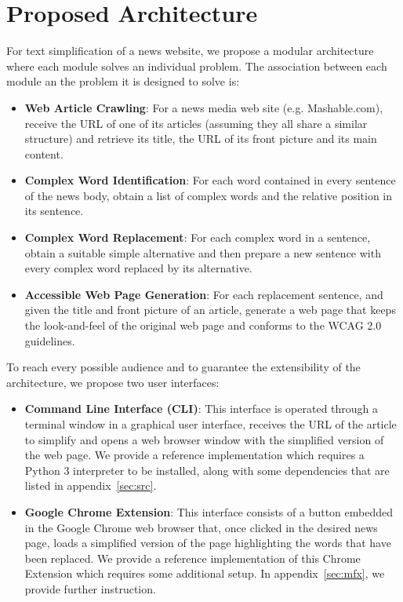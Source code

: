 \documentclass[11pt,a4paper]{article}
\begin{document}
\section{Proposed Architecture}

For text simplification of a news website, we propose a modular architecture where each module solves an individual problem. The association between each module an the problem it is designed to solve is:

\begin{itemize}
	\item{\textbf{Web Article Crawling}: For a news media web site (e.g. Mashable.com), receive the URL of one of its articles (assuming they all share a similar structure) and retrieve its title, the URL of its front picture and its main content.}
	\item{\textbf{Complex Word Identification}: For each word contained in every sentence of the news body, obtain a list of complex words and the relative position in its sentence.}
	\item{\textbf{Complex Word Replacement}: For each complex word in a sentence, obtain a suitable simple alternative and then prepare a new sentence with every complex word replaced by its alternative.}
	\item{\textbf{Accessible Web Page Generation}: For each replacement sentence, and given the title and front picture of an article, generate a web page that keeps the look-and-feel of the original web page and conforms to the WCAG 2.0~\cite{caldwell2008web} guidelines.}
\end{itemize}

To reach every possible audience and to guarantee the extensibility of the architecture, we propose two user interfaces:

\begin{itemize}
	\item{\textbf{Command Line Interface (CLI)}: This interface is operated through a terminal window in a graphical user interface, receives the URL of the article to simplify and opens a web browser window with the simplified version of the web page. We provide a reference implementation which requires a Python 3 interpreter to be installed, along with some dependencies that are listed in appendix~\ref{sec:src}}.
	\item{\textbf{Google Chrome Extension}: This interface consists of a button embedded in the Google Chrome web browser that, once clicked in the desired news page, loads a simplified version of the page highlighting the words that have been replaced. We provide a reference implementation of this Chrome Extension which requires some additional setup. In appendix~\ref{sec:mfx}, we provide further instruction.}
\end{itemize}
\end{document}
